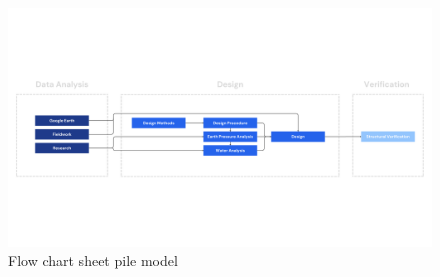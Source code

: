 \begin{landscape}
\begin{figure}[H]
    \centering
    \includegraphics[width=\linewidth]{figures/ch3/FlowChart Structural (4).png}
    \caption{Flow chart sheet pile model}
    \label{fig:flow_chart}
\end{figure}
\end{landscape}